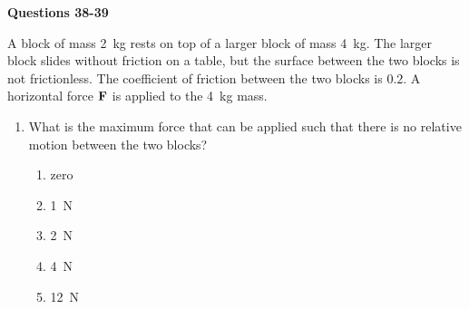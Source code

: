 \documentclass{../../oss-apphys}
\begin{document}
\begin{multicols}{2}
\begin{enumerate}[resume,leftmargin=18pt]

  \end{enumerate}
  \columnbreak
  
  \textbf{Questions 38-39}

  A block of mass \SI{2}{\kilo\gram} rests on top of a larger block of mass
  \SI{4}{\kilo\gram}. The larger block slides without friction on a table, but
  the surface between the two blocks is not frictionless. The coefficient of
  friction between the two blocks is $0.2$. A horizontal force $\mathbf{F}$ is
  applied to the \SI{4}{\kilo\gram} mass.
  \begin{enumerate}[resume,leftmargin=18pt]
  \item What is the maximum force that can be applied such that there is no
    relative motion between the two blocks?
    \begin{enumerate}[noitemsep,topsep=0pt,leftmargin=18pt,label=(\Alph*)]
    \item zero
    \item \SI{1}{\newton}
    \item \SI{2}{\newton}
    \item \SI{4}{\newton}
    \item \SI{12}{\newton}
    \end{enumerate}


\end{enumerate}
\end{multicols}
\end{document}
